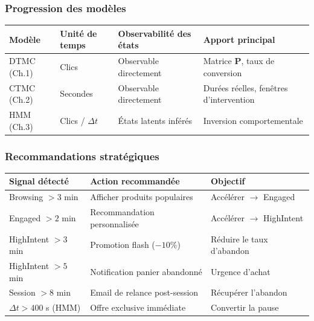 \documentclass[11pt,a4paper]{article}
\renewcommand{\arraystretch}{1.35}
\newcommand{\mat}[1]{\mathbf{#1}}
\begin{document}
\subsubsection{Progression des modèles}

\begin{center}
\begin{tabular}{llll}
\toprule
\textbf{Modèle} & \textbf{Unité de temps} & \textbf{Observabilité des états} & \textbf{Apport principal} \\
\midrule
\rowcolor{LightBlue}   DTMC (Ch.1) & Clics & Observable directement & Matrice $\mat{P}$, taux de conversion \\
\rowcolor{LightOrange} CTMC (Ch.2) & Secondes & Observable directement & Durées réelles, fenêtres d'intervention \\
\rowcolor{LightRed}    HMM (Ch.3)  & Clics / $\Delta t$ & États latents inférés & Inversion comportementale \\
\bottomrule
\end{tabular}
\end{center}

\subsubsection{Recommandations stratégiques}

\begin{center}
\renewcommand{\arraystretch}{1.4}
\begin{tabular}{lll}
\toprule
\textbf{Signal détecté} & \textbf{Action recommandée} & \textbf{Objectif} \\
\midrule
\rowcolor{LightBlue}   Browsing $> 3$ min & Afficher produits populaires & Accélérer $\to$ Engaged \\
\rowcolor{LightOrange} Engaged $> 2$ min & Recommandation personnalisée & Accélérer $\to$ HighIntent \\
\rowcolor{LightRed}    HighIntent $> 3$ min & Promotion flash ($-10\%$) & Réduire le taux d'abandon \\
\rowcolor{LightRed}    HighIntent $> 5$ min & Notification panier abandonné & Urgence d'achat \\
\rowcolor{LightGray}   Session $> 8$ min & Email de relance post-session & Récupérer l'abandon \\
\rowcolor{LightBuy}    $\Delta t > 400$ s (HMM) & Offre exclusive immédiate & Convertir la pause \\
\bottomrule
\end{tabular}
\end{center}
\end{document}
